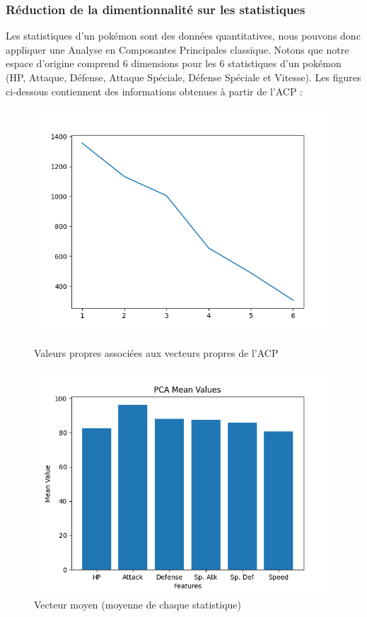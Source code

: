 \documentclass[a4paper,12pt]{article}
\begin{document}
\subsubsection{Réduction de la dimentionnalité sur les statistiques}
Les statistiques d'un pokémon sont des données quantitatives, nous pouvons donc
appliquer une Analyse en Composantes Principales classique. Notons que notre
espace d'origine comprend 6 dimensions pour les 6 statistiques d'un pokémon (HP,
Attaque, Défense, Attaque Spéciale, Défense Spéciale et Vitesse). Les figures
ci-dessous contiennent des informations obtenues à partir de l'ACP :

\begin{figure}[htbp]
    \centering
    \begin{minipage}[b]{0.45\textwidth}
        \includegraphics[width=\textwidth]{Image/explained_variation_PCA.png}
        \caption{Valeurs propres associées aux vecteurs propres de l'ACP}
    \end{minipage}
    \hfill
    \begin{minipage}[b]{0.45\textwidth}
        \includegraphics[width=\textwidth]{Image/mean_vector_PCA.png}
        \caption{Vecteur moyen (moyenne de chaque statistique)}
    \end{minipage}
    

\end{figure}
\end{document}
